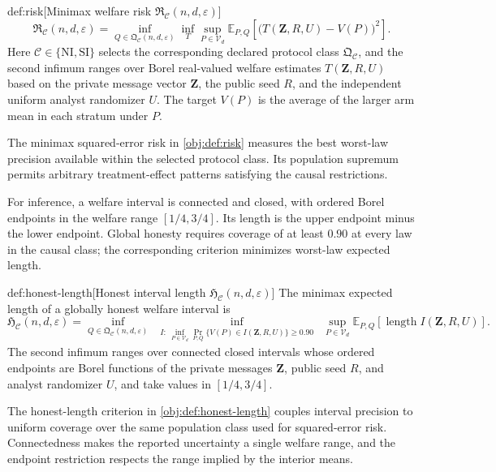 \documentclass[11pt]{article}
\begin{document}
\begin{definitionv}{def:risk}[Minimax welfare risk $\mathfrak R_{\mathcal C}(n,d,\varepsilon)$]
\[
\mathfrak R_{\mathcal C}(n,d,\varepsilon)
=
\inf_{Q\in\mathfrak Q_{\mathcal C}(n,d,\varepsilon)}
\inf_T
\sup_{P\in\mathcal V_d}
\mathbb E_{P,Q}
\left[
\bigl(T(\mathbf Z,R,U)-V(P)\bigr)^2
\right].
\]
Here \(\mathcal C\in\{\mathrm{NI},\mathrm{SI}\}\) selects the corresponding declared protocol class \(\mathfrak Q_{\mathcal C}\), and the second infimum ranges over Borel real-valued welfare estimates \(T(\mathbf Z,R,U)\) based on the private message vector \(\mathbf Z\), the public seed \(R\), and the independent uniform analyst randomizer \(U\). The target \(V(P)\) is the average of the larger arm mean in each stratum under \(P\).
\end{definitionv}

The minimax squared-error risk  in \cref{obj:def:risk} measures the best worst-law precision available within the selected protocol class. Its population supremum permits arbitrary treatment-effect patterns satisfying the causal restrictions.

For inference, a welfare interval  is connected and closed, with ordered Borel endpoints in the welfare range \([1/4,3/4]\). Its length is the upper endpoint minus the lower endpoint. Global honesty requires coverage of at least \(0.90\) at every law in the causal class; the corresponding criterion minimizes worst-law expected length.

\begin{definitionv}{def:honest-length}[Honest interval length $\mathfrak H_{\mathcal C}(n,d,\varepsilon)$]
The minimax expected length of a globally honest welfare interval is
\[
\mathfrak H_{\mathcal C}(n,d,\varepsilon)
=
\inf_{Q\in\mathfrak Q_{\mathcal C}(n,d,\varepsilon)}
\ \inf_{\substack{I:\ \inf_{P\in\mathcal V_d}
\Pr_{P,Q}\{V(P)\in I(\mathbf Z,R,U)\}\ge0.90}}
\ \sup_{P\in\mathcal V_d}
\mathbb E_{P,Q}\!\left[
\operatorname{length} I(\mathbf Z,R,U)
\right].
\]
The second infimum ranges over connected closed intervals whose ordered endpoints are Borel functions of the private messages \(\mathbf Z\), public seed \(R\), and analyst randomizer \(U\), and take values in \([1/4,3/4]\).
\end{definitionv}

The honest-length criterion  in \cref{obj:def:honest-length} couples interval precision to uniform coverage over the same population class used for squared-error risk. Connectedness makes the reported uncertainty a single welfare range, and the endpoint restriction respects the range implied by the interior means.
\end{document}
